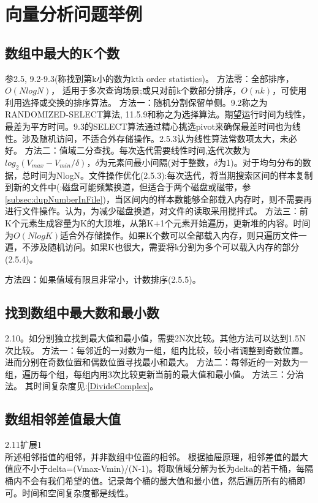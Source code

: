 
\section{向量分析问题举例}

\subsection{数组中最大的K个数}
参\cite{bop}2.5, \cite{ita}9.2-9.3(\cite{ita}称找到第k小的数为kth order statistics)。
方法零：全部排序，$O(NlogN)$， 适用于多次查询场景;或只对前k个数部分排序，$O(nk)$，可使用利用选择或交换的排序算法\cite{subsec:sortAthmClass}。
方法一：随机分割保留单侧。\cite{ita}9.2称之为RANDOMIZED-SELECT算法, \cite{pp}11.5.9和\cite{wikipedia}称之为选择算法。期望运行时间为线性，最差为平方时间。\cite{ita}9.3的SELECT算法通过精心挑选pivot来确保最差时间也为线性。涉及随机访问，不适合外存储操作。\cite{bop}2.5.3认为线性算法常数项太大，未必好。
方法二：值域二分查找。每次迭代需要线性时间,迭代次数为$log_{2}(V_{max}-V_{min}/\delta)$，$\delta$为元素间最小间隔(对于整数，$\delta$为1)。对于均匀分布的数据，总时间为NlogN。文件操作优化(\cite{bop}2.5.3):每次迭代，将当期搜索区间的样本复制到新的文件中(\cite{self}:磁盘可能频繁换道，但适合于两个磁盘或磁带，参\ref{subsec:dupNumberInFile})，当区间内的样本数能够全部载入内存时，则不需要再进行文件操作。\cite{self}认为，为减少磁盘换道，对文件的读取采用搅拌式。
方法三：前K个元素生成容量为K的大顶堆，从第K+1个元素开始遍历，更新堆的内容。时间为$O(NlogK)$适合外存储操作。如果K个数可以全部载入内存，则只遍历文件一遍，不涉及随机访问。如果K也很大，需要将k分割为多个可以载入内存的部分(\cite{bop}2.5.4)。
\label{subsec:orderStatistics}

方法四：如果值域有限且非常小，计数排序(\cite{bop}2.5.5)。

\subsection{找到数组中最大数和最小数}
\cite{bop}2.10。如分别独立找到最大值和最小值，需要2N次比较。其他方法可以达到1.5N次比较。
方法一：每邻近的一对数为一组，组内比较，较小者调整到奇数位置。进而分别在奇数位置和偶数位置寻找最小和最大。
方法二：每邻近的一对数为一组，遍历每个组，每组内用3次比较更新当前的最大值和最小值。
方法三：分治法。
其时间复杂度见:\ref{DivideComplex}。



\subsection{数组相邻差值最大值}
\cite{bop}2.11扩展1\\
所述相邻指值的相邻，并非数组中位置的相邻。
根据抽屉原理，相邻差值的最大值应不小于delta=(Vmax-Vmin)/(N-1)。将取值域分解为长为delta的若干桶，每隔桶内不会有我们希望的值。记录每个桶的最大值和最小值，然后遍历所有的桶即可。时间和空间复杂度都是线性。



